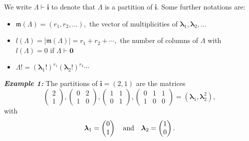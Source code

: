 \noindent We write \(\Lambda \vdash \boldsymbol{i}\) to denote that \(\Lambda\) is a partition of \(\boldsymbol{i}.\) Some further notations are:

\begin{itemize}
\item
  \(\mathfrak{m}(\Lambda)=(r_1, r_2, \ldots),\) the vector of multiplicities of \(\boldsymbol{\lambda}_1, \boldsymbol{\lambda}_2, \ldots\)
\item
  \(l(\Lambda)=|\mathfrak{m}(\Lambda)|=r_1 + r_2 + \cdots,\) the number of columns of \(\Lambda\) with \(l(\Lambda )=0\) if \(\Lambda \vdash \boldsymbol{0}\)
\item
  \(\Lambda! = (\boldsymbol{\lambda}_1!)^{r_1} (\boldsymbol{\lambda}_2!)^{r_2} \cdots\)
\end{itemize}

\hskip-0.5cm \textbf{\emph{Example 1:}} The partitions of \(\boldsymbol{i}=(2,1)\) are the matrices
\[
\begin{pmatrix}
2 \\
1
\end{pmatrix}, \begin{pmatrix}
0 & 2 \\
1 & 0
\end{pmatrix}, \begin{pmatrix}
1 & 1 \\
0 & 1
\end{pmatrix}, \begin{pmatrix}
0 & 1 & 1 \\
1 & 0 & 0
\end{pmatrix} = (\boldsymbol{\lambda}_1, \boldsymbol{\lambda}_2^2),\]
with
\[
\boldsymbol{\lambda}_1 = \begin{pmatrix}
0 \\
1
\end{pmatrix} \quad \hbox{and} \quad \boldsymbol{\lambda}_2 = \begin{pmatrix}
1 \\
0
\end{pmatrix}.
\]

